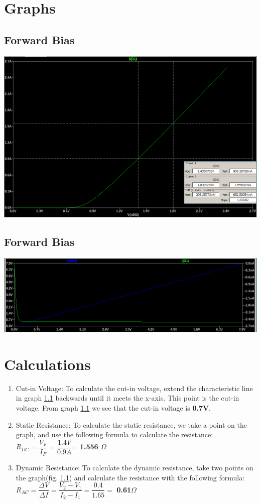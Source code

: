 \documentclass{article}
\begin{document}
	\section{Graphs}
	\subsection{Forward Bias}
		\label{graph:fwd-bias}
		\includegraphics[width=1\linewidth]{"forward bias graph"}
	\subsection{Forward Bias}
		\label{graph:rev-bias}
		\includegraphics[width=1\linewidth]{"reverse bias graph"}
		
	\section{Calculations}
	\begin{enumerate}
		\item Cut-in Voltage: To calculate the cut-in voltage, extend the characteristic line in graph \ref{graph:fwd-bias} backwards until it meets the x-axis. This point is the cut-in voltage. From graph \ref{graph:fwd-bias} we see that the cut-in voltage is \textbf{0.7V}.
		\item Static Resistance: To calculate the static resistance, we take a point on the graph, and use the following formula to calculate the resistance: \\ $ R_{DC}  =\dfrac{V_F}{I_F} = \dfrac{1.4V}{0.9A}$= \textbf{1.556 $ \Omega $}
		\item Dynamic Resistance: To calculate the dynamic resistance, take two points on the graph(fig. \ref{graph:fwd-bias}) and calculate the resistance with the following formula: \\ $ R_{AC} = \dfrac{\Delta V}{\Delta I}  = \dfrac{V_2 - V_1}{I_2 - I_1} = \dfrac{0.4}{1.65}  = $ \textbf{0.61$ \Omega $} \\
	\end{enumerate}
	
\end{document}
